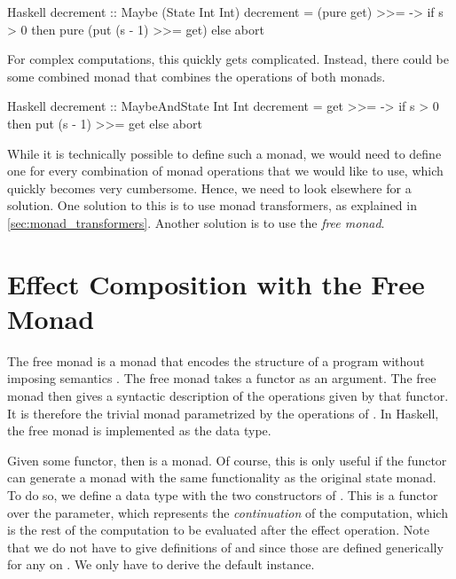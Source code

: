 \begin{lst}{Haskell}
decrement :: Maybe (State Int Int)
decrement = (pure get) >>= \s ->
              if s > 0
              then pure (put (s - 1) >>= get)
              else abort
\end{lst}

For complex computations, this quickly gets complicated. Instead, there could be some combined monad  that combines the operations of both monads.

\begin{lst}{Haskell}
decrement :: MaybeAndState Int Int
decrement = get >>= \s ->
              if s > 0
              then put (s - 1) >>= get
              else abort
\end{lst}

While it is technically possible to define such a monad, we would need to define one for every combination of monad operations that we would like to use, which quickly becomes very cumbersome. Hence, we need to look elsewhere for a solution. One solution to this is to use monad transformers, as explained in \cref{sec:monad_transformers}. Another solution is to use the \emph{free monad}.

\section{Effect Composition with the Free Monad}


The free monad is a monad that encodes the structure of a program without imposing semantics \citationneeded. The free monad takes a functor  as an argument. The free monad then gives a syntactic description of the operations given by that functor. It is therefore the trivial monad parametrized by the operations of . In Haskell, the free monad is implemented as the  data type.


\noindent Given some  functor, then  is a monad. Of course, this is only useful if the  functor can generate a monad with the same functionality as the original state monad. To do so, we define a data type with the two constructors of . This is a functor over the  parameter, which represents the \emph{continuation} of the computation, which is the rest of the computation to be evaluated after the effect operation. Note that we do not have to give definitions of  and \hs{>>=} since those are defined generically for any  on . We only have to derive the default  instance.

